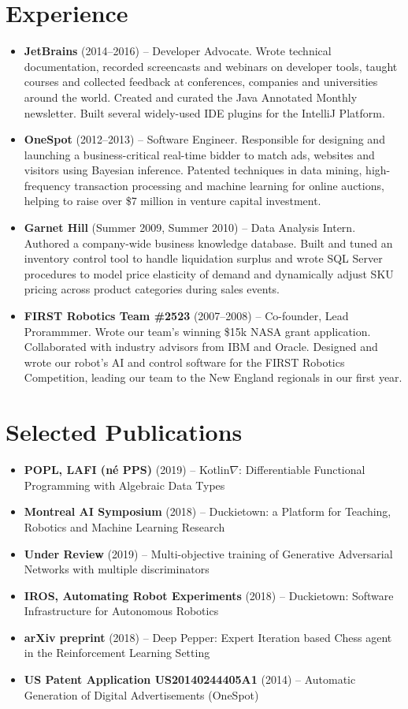 \documentclass[letterpaper,11pt]{article}
\newcommand{\resumeItem}[2]{
\item\small{
\textbf{#1}{ #2 \vspace{-2pt}}
}
}
\newcommand{\resumeSubItem}[2]{\resumeItem{#1}{#2}\vspace{-4pt}}
\newcommand{\resumeSubHeadingListStart}{\begin{itemize}[leftmargin=*]}
\newcommand{\resumeSubHeadingListEnd}{\end{itemize}}
\begin{document}
\begin{justify}
\section{Experience}
\resumeSubHeadingListStart
\resumeSubItem{JetBrains}{(2014--2016) -- Developer Advocate. Wrote technical documentation, recorded screencasts and webinars on developer tools, taught courses and collected feedback at conferences, companies and universities around the world. Created and curated the Java Annotated Monthly newsletter. Built several widely-used IDE plugins for the IntelliJ Platform.}
\resumeSubItem{OneSpot}{(2012--2013) -- Software Engineer. Responsible for designing and launching a business-critical real-time bidder to match ads, websites and visitors using Bayesian inference. Patented techniques in data mining, high-frequency transaction processing and machine learning for online auctions, helping to raise over \$7 million in venture capital investment.}
\resumeSubItem{Garnet Hill}{(Summer 2009, Summer 2010) -- Data Analysis Intern. Authored a company-wide business knowledge database. Built and tuned an inventory control tool to handle liquidation surplus and wrote SQL Server procedures to model price elasticity of demand and dynamically adjust SKU pricing across product categories during sales events.}
\resumeSubItem{FIRST Robotics Team \#2523}{(2007--2008) -- Co-founder, Lead Prorammmer. Wrote our team's winning \$15k NASA grant application. Collaborated with industry advisors from IBM and Oracle. Designed and wrote our robot's AI and control software for the FIRST Robotics Competition, leading our team to the New England regionals in our first year.}
\resumeSubHeadingListEnd


\section{Selected Publications}
\resumeSubHeadingListStart
\resumeSubItem{POPL, LAFI (n\'e PPS)} {(2019) -- Kotlin$\nabla$: Differentiable Functional Programming with Algebraic Data Types}
\resumeSubItem{Montreal AI Symposium} {(2018) -- Duckietown: a Platform for Teaching, Robotics and Machine Learning Research}
\resumeSubItem{Under Review} {(2019) -- Multi-objective training of Generative Adversarial Networks with multiple discriminators}
\resumeSubItem{IROS, Automating Robot Experiments} {(2018) -- Duckietown: Software Infrastructure for Autonomous Robotics}
\resumeSubItem{arXiv preprint} {(2018) -- Deep Pepper: Expert Iteration based Chess agent in the Reinforcement Learning Setting}
\resumeSubItem{US Patent Application US20140244405A1} {(2014) -- Automatic Generation of Digital Advertisements (OneSpot)}
\resumeSubHeadingListEnd


\end{justify}
\end{document}

